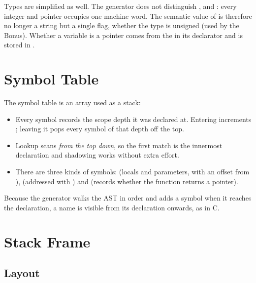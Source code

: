 \documentclass[12pt]{article}
\begin{document}
Types are simplified as well. The generator does not distinguish ,  and :
every integer and pointer occupies one machine word. The semantic value of  is therefore no
longer a string but a single flag, whether the type is unsigned (used by the Bonus). Whether a variable is
a pointer comes from the \code{*} in its declarator and is stored in .

\section{Symbol Table}


The symbol table is an array used as a stack:

\begin{itemize}
  \item Every symbol records the scope depth it was declared at. Entering \code{\{ \}} increments
        ; leaving it pops every symbol of that depth off the top.
  \item Lookup scans \emph{from the top down}, so the first match is the innermost declaration and
        shadowing works without extra effort.
  \item There are three kinds of symbols:  (locals and parameters, with an offset from
        ),  (addressed with ) and  (records whether the
        function returns a pointer).
\end{itemize}

Because the generator walks the AST in order and adds a symbol when it reaches the declaration, a name
is visible from its declaration onwards, as in C.

\section{Stack Frame}

\subsection{Layout}
\end{document}
